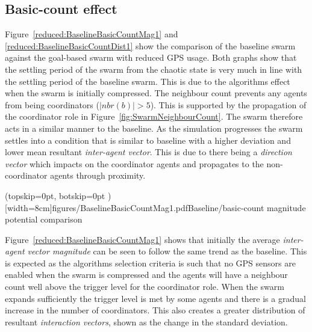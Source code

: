 \documentclass{ieeeaccess}
\begin{document}
\subsection{Basic-count effect\label{section:compareBaselineBasicCount1}}
Figure~\ref{reduced:BaselineBasicCountMag1} and \ref{reduced:BaselineBasicCountDist1} show the comparison of the baseline swarm against the goal-based swarm with reduced GPS usage. Both graphs show that the settling period of the swarm from the chaotic state is very much in line with the settling period of the baseline swarm. This is due to the algorithms effect when the swarm is initially compressed. The neighbour count prevents any agents from being coordinators ($|nbr(b)| > 5$). This is supported by the propagation of the coordinator role in Figure~\ref{fig:SwarmNeighbourCount}. The swarm therefore acts in a similar manner to the baseline. As the simulation progresses the swarm settles into a condition that is similar to baseline with a higher deviation and lower mean resultant \textit{inter-agent vector}. This is due to there being a \textit{direction vector} which impacts on the coordinator agents and propagates to the non-coordinator agents through proximity. 


\Figure[t!](topskip=0pt, botskip=0pt )[width=8cm]{figures/BaselineBasicCountMag1.pdf}{Baseline/basic-count magnitude potential comparison\label{reduced:BaselineBasicCountMag1}}

Figure~\ref{reduced:BaselineBasicCountMag1} shows that initially the average \textit{inter-agent vector magnitude} can be seen to follow the same trend as the baseline. This is expected as the algorithms selection criteria is such that no GPS sensors are enabled when the swarm is compressed and the agents will have a neighbour count well above the trigger level for the coordinator role. When the swarm expands sufficiently the trigger level is met by some agents and there is a gradual increase in the number of coordinators. This also creates a greater distribution of resultant \textit{interaction vectors}, shown as the change in the standard deviation. 

 
\end{document}
